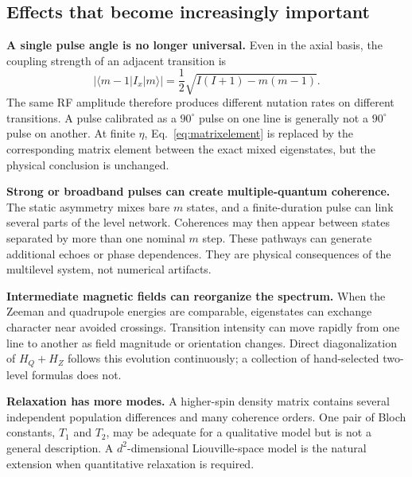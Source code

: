 \documentclass[11pt,letterpaper]{article}
\newcommand{\ket}[1]{\lvert #1\rangle}
\newcommand{\bra}[1]{\langle #1\rvert}
\begin{document}
\subsection{Effects that become increasingly important}

\textbf{A single pulse angle is no longer universal.}
Even in the axial basis, the coupling strength of an adjacent transition is
\begin{equation}
\left|\bra{m-1}I_x\ket m\right|
=\frac12\sqrt{I(I+1)-m(m-1)}.
\label{eq:matrixelement}
\end{equation}
The same RF amplitude therefore produces different nutation rates on different transitions. A pulse calibrated as a $90^\circ$ pulse on one line is generally not a $90^\circ$ pulse on another. At finite $\eta$, Eq.~\eqref{eq:matrixelement} is replaced by the corresponding matrix element between the exact mixed eigenstates, but the physical conclusion is unchanged.

\textbf{Strong or broadband pulses can create multiple-quantum coherence.}
The static asymmetry mixes bare $m$ states, and a finite-duration pulse can link several parts of the level network. Coherences may then appear between states separated by more than one nominal $m$ step. These pathways can generate additional echoes or phase dependences. They are physical consequences of the multilevel system, not numerical artifacts.

\textbf{Intermediate magnetic fields can reorganize the spectrum.}
When the Zeeman and quadrupole energies are comparable, eigenstates can exchange character near avoided crossings. Transition intensity can move rapidly from one line to another as field magnitude or orientation changes. Direct diagonalization of $H_Q+H_Z$ follows this evolution continuously; a collection of hand-selected two-level formulas does not.

\textbf{Relaxation has more modes.}
A higher-spin density matrix contains several independent population differences and many coherence orders. One pair of Bloch constants, $T_1$ and $T_2$, may be adequate for a qualitative model but is not a general description. A $d^2$-dimensional Liouville-space model is the natural extension when quantitative relaxation is required.
\end{document}
